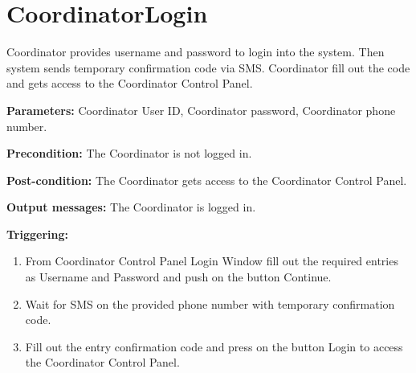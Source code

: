 \section{CoordinatorLogin}
\label{operation:CoordinatorLogin}
Coordinator provides username and password to login into the system. 
Then system sends temporary confirmation code via SMS. 
Coordinator fill out the code and gets access to the Coordinator Control Panel.
\begin{description}

\item \textbf{Parameters:} Coordinator User ID, Coordinator password,
Coordinator phone number.
\item \textbf{Precondition:} The Coordinator is not logged in.
\item \textbf{Post-condition:} The Coordinator gets access to the
Coordinator Control Panel.
\item \textbf{Output messages:} The Coordinator is logged in.

\item \textbf{Triggering:}
\begin{enumerate}
\item From Coordinator Control Panel Login Window fill out the required entries as Username and Password and push on the button Continue.
\item Wait for SMS on the provided phone number with temporary confirmation code.
\item Fill out the entry confirmation code and press on the button Login to
access the Coordinator Control Panel.
\end{enumerate}
 
\end{description}
